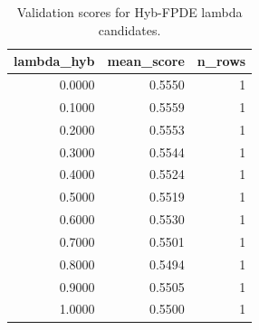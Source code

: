 \begin{table}[t]
\caption{Validation scores for Hyb-FPDE lambda candidates.}
\label{tab:lambda_distribution_computed}
\centering
\begin{tabular}{rrr}
\toprule
lambda\_hyb & mean\_score & n\_rows \\
\midrule
0.0000 & 0.5550 & 1 \\
0.1000 & 0.5559 & 1 \\
0.2000 & 0.5553 & 1 \\
0.3000 & 0.5544 & 1 \\
0.4000 & 0.5524 & 1 \\
0.5000 & 0.5519 & 1 \\
0.6000 & 0.5530 & 1 \\
0.7000 & 0.5501 & 1 \\
0.8000 & 0.5494 & 1 \\
0.9000 & 0.5505 & 1 \\
1.0000 & 0.5500 & 1 \\
\bottomrule
\end{tabular}

\end{table}

